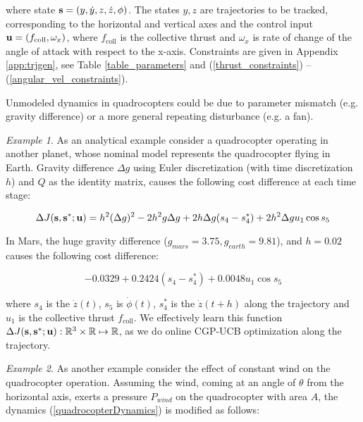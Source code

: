 where state $\mathbf{s} = (y,\dot{y},z,\dot{z},\phi)$. The states $y, z$ are trajectories to be tracked, corresponding to the horizontal and vertical axes and the control input $\mathbf{u} = (f_{\mathrm{coll}}, \omega_x)$, where $f_{\mathrm{coll}}$ is the collective thrust and $\omega_x$ is rate of change of the angle of attack with respect to the x-axis. Constraints are given in Appendix \ref{app:trjgen}, see Table \ref{table_parameters} and (\ref{thrust_constraints}) -- (\ref{angular_vel_constraints}). 

Unmodeled dynamics in quadrocopters could be due to parameter mismatch (e.g. gravity difference) or a more general repeating disturbance (e.g. a fan).

\textit{Example 1}. As an analytical example consider a quadrocopter operating in another planet, whose nominal model represents the quadrocopter flying in Earth. Gravity difference $\Delta g$ using Euler discretization (with time discretization $h$) and $Q$ as the identity matrix, causes the following cost difference at each time stage:

\begin{equation}
\Delta J(\mathbf{s},\mathbf{s}^{*};\mathbf{u}) = h^{2}(\Delta g)^{2} - 2h^{2}g\Delta g + 2h\Delta g(s_{4}-s^{*}_{4}) + 2h^{2}\Delta g u_{1} \cos s_{5} \label{example1General} 
\end{equation}

In Mars, the huge gravity difference ($g_{mars} = 3.75, g_{earth} = 9.81$), and $h = 0.02$ causes the following cost difference:

\begin{equation*}
-0.0329 + 0.2424(s_{4} - s^{*}_{4}) + 0.0048u_{1}\cos s_{5} \label{exampleMars} 
\end{equation*}

where $s_{4}$ is the $\dot{z}(t)$, $s_{5}$ is $\dot{\phi}(t)$, $s^{*}_{4}$ is the $\dot{z}(t+h)$ along the trajectory and $u_{1}$ is the collective thrust $f_{\mathrm{coll}}$. We effectively learn this function $\Delta J(\mathbf{s}, \mathbf{s}^{*}; \mathbf{u}): \mathbb{R}^{3} \times \mathbb{R} \mapsto \mathbb{R}$, as we do online CGP-UCB optimization along the trajectory.

\textit{Example 2}. As another example consider the effect of constant wind on the quadrocopter operation. Assuming the wind, coming at an angle of $\theta$ from the horizontal axis, exerts a pressure $P_{wind}$ on the quadrocopter with area $A$, the dynamics (\ref{quadrocopterDynamics}) is modified as follows: 


